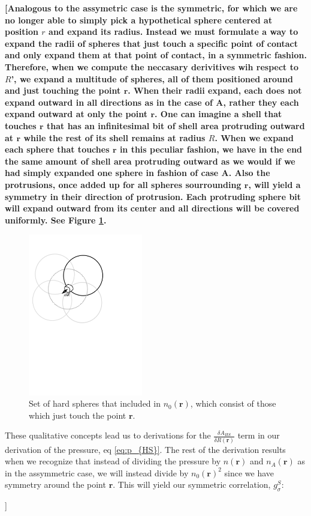 \documentclass[letterpaper,twocolumn,amsmath,amssymb,jcp,10pt,aip]{revtex4-1}
\newcommand{\red}[1]{{\bf \color{red} #1}}
\newcommand{\fixme}[1]{\red{[#1]}}
\begin{document}
\fixme{Analogous to the assymetric case is the symmetric, for which 
we are no longer able to simply pick a hypothetical sphere centered 
at position $r$ and expand its radius.  Instead we must formulate a way 
to expand the radii of spheres that just touch a specific point of 
contact and only expand them at that point of contact, in a symmetric 
fashion.  Therefore, when we compute the neccasary derivitives wih 
respect to $R$', we expand a multitude of spheres, all of them positioned 
around and just touching the point $\mathbf{r}$.  When their radii 
expand, each does not expand outward in all directions as in the 
case of A, rather they each expand outward at only the point $\mathbf{r}$.  One can imagine a shell that touches $\mathbf{r}$ that has an infinitesimal bit of shell area protruding outward at $\mathbf{r}$ while the rest of its shell remains 
at radius $R$.  When we expand each sphere that touches $\mathbf{r}$ 
in this peculiar fashion, we have in the end the same amount of shell 
area protruding outward as we would if we had simply expanded one 
sphere in fashion of case A.  Also the protrusions, once added up 
for all spheres sourrounding $\mathbf{r}$, will yield a symmetry 
in their direction of protrusion.  Each protruding sphere bit will 
expand outward from its center and all directions will be covered uniformly.
See Figure \ref{fig:contact}.

\begin{figure}
\includegraphics[width=5cm]{figs/contact}
\caption{Set of hard spheres that included in $n_0(\mathbf{r})$, which
  consist of those which just touch the point $\mathbf{r}$.}
\label{fig:contact}
\end{figure}

These qualitative concepts lead us to derivations for the $\frac{\delta A_{HS}}{\delta R(\mathbf{r})}$ term in our derivation of the pressure, eq \ref{eq:p_{HS}}.  The rest of the derivation results when we recognize that instead of dividing the pressure by $n(\mathbf{r})$ and $n_A(\mathbf{r})$ as in the assymmetric case, we will instead divide by $n_0(\mathbf{r})^2$ since we have symmetry around the point $\mathbf{r}$.  This will yield our symmetric correlation, $g_\sigma^S$:

}
\end{document}
